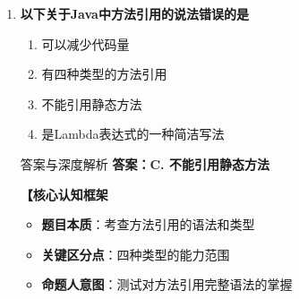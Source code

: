 \documentclass[12pt, a4paper]{ctexart}
\begin{document}
\begin{enumerate}[label=\textbf{\arabic*.}]
\begin{bluebox}{答案与深度解析}
\begin{itemize}[leftmargin=*, nosep, label={}]
\begin{itemize}[label={}, leftmargin=*, nosep]
\begin{lstlisting}[language=Java]
// OK：仍然是函数式接口
FunctionalWithDefault fd = () -> {};
				      \end{lstlisting}
				            \item \textbf{Java8特性}：默认方法让接口可扩展
			            \end{itemize}
		      \end{itemize}

		      \textbf{【应背诵知识点}
		      \begin{itemize}[label={}, nosep]
			      \item 函数式接口：只有一个抽象方法的接口
			      \item 可包含：多个默认方法、多个静态方法
			      \item @FunctionalInterface：可选，编译器检查
			      \item 常见接口：Runnable、Consumer、Function、Predicate、Supplier
		      \end{itemize}

		      \textbf{【命题趋势与实战策略】}

		      \textbf{考场秒杀}：看到函数式接口定义→选"一个抽象方法"，静态/默认方法选错误
	      \end{bluebox}

	      \vspace{1em}

	\item \textbf{以下关于Java中方法引用的说法错误的是}
	      \begin{enumerate}[label=\Alph*.]
		      \item 可以减少代码量
		      \item 有四种类型的方法引用
		      \item 不能引用静态方法
		      \item 是Lambda表达式的一种简洁写法
	      \end{enumerate}

	      \begin{bluebox}{答案与深度解析}
		      \textbf{答案：C. 不能引用静态方法}

		      \textbf{【核心认知框架}
		      \begin{itemize}[label={}, leftmargin=*, nosep]
			      \item \textbf{题目本质}：考查方法引用的语法和类型
			      \item \textbf{关键区分点}：四种类型的能力范围
			      \item \textbf{命题人意图}：测试对方法引用完整语法的掌握
		      \end{itemize}


\end{bluebox}
\end{enumerate}
\end{document}
